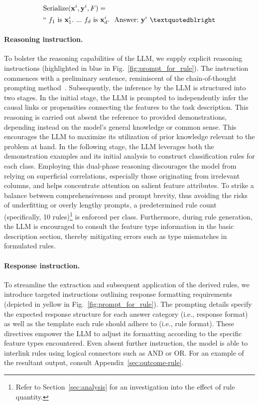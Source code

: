 \begin{align}
&\text{Serialize}(\mathbf{x}^i,\mathbf{y}^i, F) = \nonumber \\ 
&``\ f_1\ \text{is}\ \mathbf{x}^i_1.\ ... \ f_d\  \text{is}\  \mathbf{x}^i_d.\ \ \text{Answer:}\  \mathbf{y}^i\ ”
\end{align}

\vspace*{-0.12in}
\paragraph{Reasoning instruction.} To bolster the reasoning capabilities of the LLM, we supply explicit reasoning instructions (highlighted in blue in Fig.~\ref{fig:prompt_for_rule}). The instruction commences with a preliminary sentence, reminiscent of the chain-of-thought prompting method~\cite{wei2022chain}. Subsequently, the inference by the LLM is structured into two stages. In the initial stage, the LLM is prompted to independently infer the causal links or propensities connecting the features to the task description. This reasoning is carried out absent the reference to provided demonstrations, depending instead on the model's general knowledge or common sense. This encourages the LLM to maximize its utilization of prior knowledge relevant to the problem at hand. In the following stage, the LLM leverages both the demonstration examples and its initial analysis to construct classification rules for each class. Employing this dual-phase reasoning discourages the model from relying on superficial correlations, especially those originating from irrelevant columns, and helps concentrate attention on salient feature attributes. To strike a balance between comprehensiveness and prompt brevity, thus avoiding the risks of underfitting or overly lengthy prompts, a predetermined rule count (specifically, 10 rules)\footnote{Refer to Section~\ref{sec:analysis} for an investigation into the effect of rule quantity.} is enforced per class. Furthermore, during rule generation, the LLM is encouraged to consult the feature type information in the basic description section, thereby mitigating errors such as type mismatches in formulated rules.

\vspace*{-0.12in}
\paragraph{Response instruction.} To streamline the extraction and subsequent application of the derived rules, we introduce targeted instructions outlining response formatting requirements (depicted in yellow in Fig.~\ref{fig:prompt_for_rule}). The prompting details specify the expected response structure for each answer category (i.e., response format) as well as the template each rule should adhere to (i.e., rule format). These directives empower the LLM to adjust its formatting according to the specific feature types encountered. Even absent further instruction, the model is able to interlink rules using logical connectors such as AND or OR. For an example of the resultant output, consult Appendix~\ref{sec:outcome-rule}.


